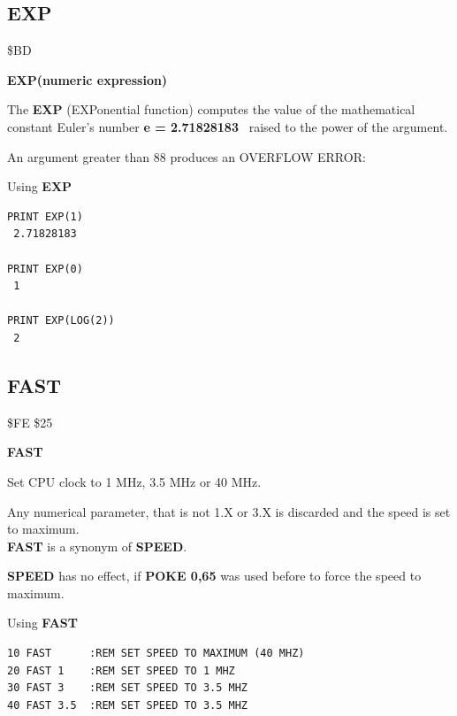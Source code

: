 \subsection{EXP}
\begin{description}[leftmargin=2cm,style=nextline]
\item [Token:] \$BD
\item [Format:] {\bf EXP(numeric expression)}
\item [Usage:] The {\bf EXP} (EXPonential function) computes
               the value of the mathematical constant
               Euler's number {\bf e = 2.71828183}
               raised to the power of the
               argument.

\item [Remarks:] An argument greater than 88 produces
                 an OVERFLOW ERROR:
\item [Example:] Using {\bf EXP}
\begin{tcolorbox}[colback=black,coltext=white]
\verbatimfont{\codefont}
\begin{verbatim}
PRINT EXP(1)
 2.71828183

PRINT EXP(0)
 1

PRINT EXP(LOG(2))
 2
\end{verbatim}
\end{tcolorbox}
\end{description}


\newpage
\subsection{FAST}
\begin{description}[leftmargin=2cm,style=nextline]
\item [Token:] \$FE \$25
\item [Format:] {\bf FAST}
\item [Usage:] Set CPU clock to 1 MHz, 3.5 MHz or 40 MHz.
\item [Remarks:] Any numerical parameter, that is not 1.X or 3.X
                 is discarded and the speed is set to maximum. \\
                 {\bf FAST} is a synonym of {\bf SPEED}.

                 {\bf SPEED} has no effect, if {\bf POKE 0,65}
                 was used before to force the speed to maximum.

\item [Example:] Using {\bf FAST}
\begin{tcolorbox}[colback=black,coltext=white]
\verbatimfont{\codefont}
\begin{verbatim}
10 FAST      :REM SET SPEED TO MAXIMUM (40 MHZ)
20 FAST 1    :REM SET SPEED TO 1 MHZ
30 FAST 3    :REM SET SPEED TO 3.5 MHZ
40 FAST 3.5  :REM SET SPEED TO 3.5 MHZ
\end{verbatim}
\end{tcolorbox}
\end{description}


